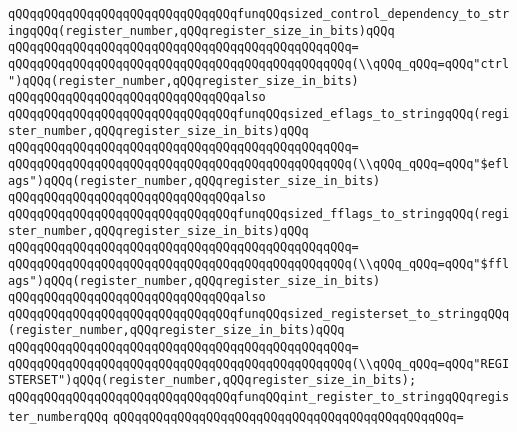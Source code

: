 \verb|qQQqqQQqqQQqqQQqqQQqqQQqqQQqqQQqfunqQQqsized_control_dependency_to_stringqQQq(register_number,qQQqregister_size_in_bits)qQQq|\newline
\verb|qQQqqQQqqQQqqQQqqQQqqQQqqQQqqQQqqQQqqQQqqQQqqQQq=|\newline
\verb|qQQqqQQqqQQqqQQqqQQqqQQqqQQqqQQqqQQqqQQqqQQqqQQq(\\qQQq_qQQq=qQQq"ctrl")qQQq(register_number,qQQqregister_size_in_bits)|\newline
\newline
\verb|qQQqqQQqqQQqqQQqqQQqqQQqqQQqqQQqalso|\newline
\verb|qQQqqQQqqQQqqQQqqQQqqQQqqQQqqQQqfunqQQqsized_eflags_to_stringqQQq(register_number,qQQqregister_size_in_bits)qQQq|\newline
\verb|qQQqqQQqqQQqqQQqqQQqqQQqqQQqqQQqqQQqqQQqqQQqqQQq=|\newline
\verb|qQQqqQQqqQQqqQQqqQQqqQQqqQQqqQQqqQQqqQQqqQQqqQQq(\\qQQq_qQQq=qQQq"$eflags")qQQq(register_number,qQQqregister_size_in_bits)|\newline
\newline
\verb|qQQqqQQqqQQqqQQqqQQqqQQqqQQqqQQqalso|\newline
\verb|qQQqqQQqqQQqqQQqqQQqqQQqqQQqqQQqfunqQQqsized_fflags_to_stringqQQq(register_number,qQQqregister_size_in_bits)qQQq|\newline
\verb|qQQqqQQqqQQqqQQqqQQqqQQqqQQqqQQqqQQqqQQqqQQqqQQq=|\newline
\verb|qQQqqQQqqQQqqQQqqQQqqQQqqQQqqQQqqQQqqQQqqQQqqQQq(\\qQQq_qQQq=qQQq"$fflags")qQQq(register_number,qQQqregister_size_in_bits)|\newline
\newline
\verb|qQQqqQQqqQQqqQQqqQQqqQQqqQQqqQQqalso|\newline
\verb|qQQqqQQqqQQqqQQqqQQqqQQqqQQqqQQqfunqQQqsized_registerset_to_stringqQQq(register_number,qQQqregister_size_in_bits)qQQq|\newline
\verb|qQQqqQQqqQQqqQQqqQQqqQQqqQQqqQQqqQQqqQQqqQQqqQQq=|\newline
\verb|qQQqqQQqqQQqqQQqqQQqqQQqqQQqqQQqqQQqqQQqqQQqqQQq(\\qQQq_qQQq=qQQq"REGISTERSET")qQQq(register_number,qQQqregister_size_in_bits);|\newline
\newline
\verb|qQQqqQQqqQQqqQQqqQQqqQQqqQQqqQQqfunqQQqint_register_to_stringqQQqregister_numberqQQq|\newline
\verb|qQQqqQQqqQQqqQQqqQQqqQQqqQQqqQQqqQQqqQQqqQQqqQQq=|\newline
